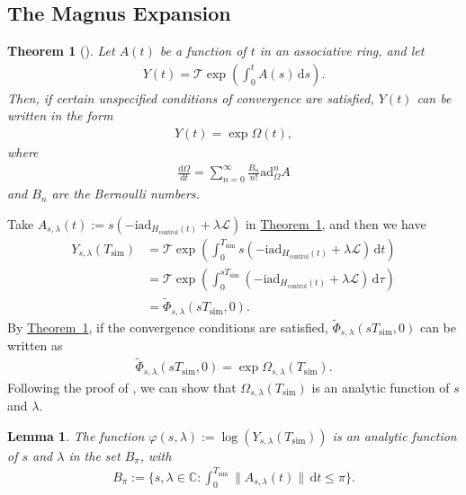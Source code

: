 \documentclass[11pt]{article}
\newtheorem{theorem}{Theorem}
\newtheorem{lemma}{Lemma}
\newcommand{\thm}[1]{\hyperref[thm:#1]{Theorem~\ref*{thm:#1}}}
\renewcommand{\i}{\mathrm{i}}
\renewcommand{\d}{\mathrm{d}}
\renewcommand{\L}{\mathcal{L}}
\newcommand{\ad}{\mathrm{ad}}
\newcommand{\T}{\mathcal{T}}
\newcommand{\simu}{\mathrm{sim}}
\newcommand{\Hc}{H_{\mathrm{control}}}
\begin{document}
\subsection{The Magnus Expansion}
\begin{theorem}[{\cite[Theorem III]{magnus1954}}]
\label{thm:magnus-exp}
    Let $A(t)$ be a function of $t$ in an associative ring, and let \begin{align*}
        Y(t) = \T \exp(\int_{0}^{t} A(s)\,\d s).
    \end{align*}
    Then, if certain unspecified conditions of convergence are satisfied, $Y(t)$ can be written in the form \begin{align*}
        Y(t) = \exp \Omega(t),
    \end{align*}
    where 
    \begin{align*}
        \frac{\d \Omega}{\d t}=\sum_{n=0}^{\infty} \frac{B_n}{n!} \ad_{\Omega}^n A
    \end{align*}
    and $B_n$ are the Bernoulli numbers.
\end{theorem}
Take $A_{s,\lambda}(t) := s(-\i \ad_{\Hc(t)}+\lambda\L)$ in \thm{magnus-exp}, and then we have \begin{align}
    Y_{s,\lambda}(T_{\simu}) & = \T\exp(\int_{0}^{T_\simu} s(-\i \ad_{\Hc(t)}+\lambda\L)\,\d t)\\
    & = \T\exp(\int_{0}^{sT_\simu}(-\i \ad_{\Hc(t)}+\lambda\L)\,\d \tau) \\
    & =\tilde{\Phi}_{s,\lambda}(sT_{\simu}, 0).
\end{align}
By \thm{magnus-exp}, if the convergence conditions are satisfied, $\tilde{\Phi}_{s,\lambda}(sT_{\simu}, 0)$ can be written as \begin{align*}
    \tilde{\Phi}_{s,\lambda}(sT_{\simu}, 0) = \exp \Omega_{s,\lambda}(T_{\simu}).
\end{align*}
Following the proof of \cite[Theorem 6]{blanes2009magnus}, we can show that $\Omega_{s,\lambda}(T_{\simu})$ is an analytic function of $s$ and $\lambda$.
\begin{lemma}
    \label{lem:analytic-phi}
    The function $\varphi(s,\lambda):=\log(Y_{s,\lambda}(T_{\simu}))$ is an analytic function of $s$ and $\lambda$ in the set $B_{\pi}$, with \begin{align*}
        B_{\pi} :=\{s,\lambda \in \mathbb{C}: \int_{0}^{T_{\simu}}\|A_{s,\lambda}(t) \|\,\d t\le \pi \}.
    \end{align*}
\end{lemma}
 
\end{document}
